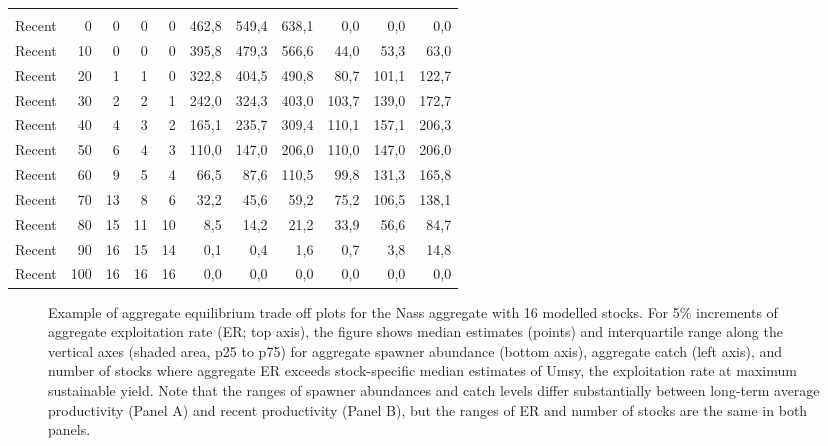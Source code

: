 \documentclass[french,11pt]{book}
\begin{document}
\begin{longtable}[t]{lrrrrrrrrrr}
\midrule\\ Recent & 0 & 0 & 0 & 0 & 462,8 & 549,4 & 638,1 & 0,0 & 0,0 & 0,0\\ Recent & 10 & 0 & 0 & 0 & 395,8 & 479,3 & 566,6 & 44,0 & 53,3 & 63,0\\ Recent & 20 & 1 & 1 & 0 & 322,8 & 404,5 & 490,8 & 80,7 & 101,1 & 122,7\\ Recent & 30 & 2 & 2 & 1 & 242,0 & 324,3 & 403,0 & 103,7 & 139,0 & 172,7\\ Recent & 40 & 4 & 3 & 2 & 165,1 & 235,7 & 309,4 & 110,1 & 157,1 & 206,3\\ Recent & 50 & 6 & 4 & 3 & 110,0 & 147,0 & 206,0 & 110,0 & 147,0 & 206,0\\ Recent & 60 & 9 & 5 & 4 & 66,5 & 87,6 & 110,5 & 99,8 & 131,3 & 165,8\\ Recent & 70 & 13 & 8 & 6 & 32,2 & 45,6 & 59,2 & 75,2 & 106,5 & 138,1\\ Recent & 80 & 15 & 11 & 10 & 8,5 & 14,2 & 21,2 & 33,9 & 56,6 & 84,7\\ Recent & 90 & 16 & 15 & 14 & 0,1 & 0,4 & 1,6 & 0,7 & 3,8 & 14,8\\ Recent & 100 & 16 & 16 & 16 & 0,0 & 0,0 & 0,0 & 0,0 & 0,0 & 0,0\\* \end{longtable}

\endgroup{} \endgroup{}

\clearpage


\begin{figure}[htb]

{\centering {} 

}

\caption{Example of aggregate equilibrium trade off plots for the Nass aggregate with 16 modelled stocks. For 5\% increments of aggregate exploitation rate (ER; top axis), the figure shows median estimates (points) and interquartile range along the vertical axes (shaded area, p25 to p75) for aggregate spawner abundance (bottom axis), aggregate catch (left axis), and number of stocks where aggregate ER exceeds stock-specific median estimates of Umsy, the exploitation rate at maximum sustainable yield. Note that the ranges of spawner abundances and catch levels differ substantially between long-term average productivity (Panel A) and recent productivity (Panel B), but the ranges of ER and number of stocks are the same in both panels.}\label{fig:ERBasedProfileNass}
\end{figure}
\clearpage
\end{document}
